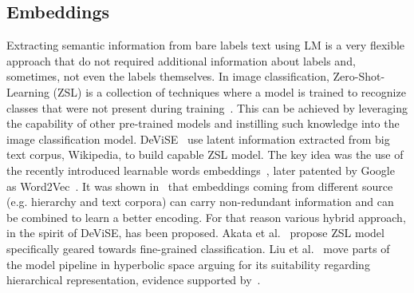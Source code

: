 \subsection{Embeddings}
\label{subsec:embeddings}

Extracting semantic information from bare labels text using LM is a very
flexible approach that do not required additional information about labels and,
sometimes, not even the labels themselves. In image classification,
Zero-Shot-Learning (ZSL) is a collection of techniques where a model is trained
to recognize classes that were not present during
training~\cite{AnIntroductionSoysal2020}. This can be achieved by leveraging
the capability of other pre-trained models and instilling such knowledge into
the image classification model. DeViSE~\cite{DeviseADeepFrome2013} use latent
information extracted from big text corpus, Wikipedia, to build capable ZSL
model. The key idea was the use of the recently introduced learnable words
embeddings~\cite{EfficientEstimMikolo2013, DistributedRepMikolo2013}, later
patented by Google as Word2Vec~\cite{ComputingNumerMikolo2013}. It was shown
in~\cite{EvaluationOfOAkata2014, LabelEmbeddingAkata2015} that embeddings
coming from different source (e.g. hierarchy and text corpora) can carry
non-redundant information and can be combined to learn a better encoding. For
that reason various hybrid approach, in the spirit of DeViSE, has been
proposed. Akata et al.~\cite{EvaluationOfOAkata2014} propose ZSL model
specifically geared towards fine-grained classification. Liu et
al.~\cite{HyperbolicVisuLiuS2020} move parts of the model pipeline in
hyperbolic space arguing for its suitability regarding hierarchical
representation, evidence supported by~\cite{PoincareEmbeddNickel2017,
HyperbolicEntaGanea2018}.

